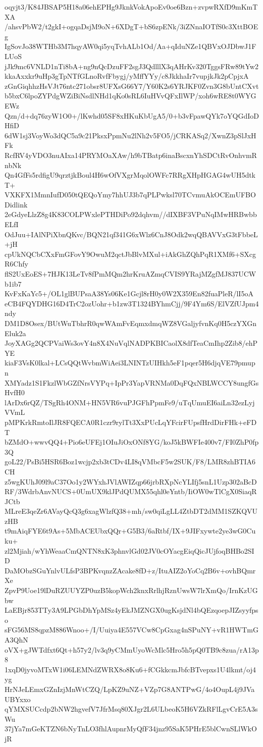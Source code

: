 oqyjt3/K84JBSAP5H18a06ehEPHg9JknkVokApoEv0oe6Bzn+zvpwRXfD9mKmTXA
/ahsvPbW2/t2gkI+ogqaDsjM9oN+6XDgT+bS6zpENk/3iZNnaIOTfS0c3XttBOEg
IgSovJo38WTHb3M7hqyAW0qi5yqTvhALb1Od/Aa+qIduNZe1QBVxOJDbwJ1FLUoS
jJk9mc6VNLD1nTi8bA+ng9nQcDzuFF2sgJ3QdlllX3qAHrKv320TggsFRw89tYw2
kkaAxxkr9uHp3gTpNTfGLnoRvfFbygj/yMffYYy/c8JkkhaIr7vupjkJk2pCpjxA
zGnGiqhhzHsVJt76ntc271obsr8UFXsG66Y7/Y60K2s6YRJKF0Zvn3G8bUntCXvt
b5bxC6lpoZYPdgWZiBiNsdlNHd1qKo0sRL6IuHVvQFxIlWP/xoh6wRE8t0WYGEWz
Qzn/d+dq76zyW1O0+/lKwhd05SF8xHKuKbUgA5/0+b3vFpawQYk7oYQGdIoDHfiD
6dW1sj3VoyWo3dQC5a9c21PksxPpmNu2lNh2v5FO5/jCRKASq2/XwnZ3pSlJxHFk
RcfRV4yVDO3nuAIxa14PRYMOaXAw/h9bTBatp6inaBscxnYhSDCtRvOnhvmRnbNk
Qn4GfFs5rdfigU9qrztjkBoul4H6wOfVXgrMqolOWFc7RRgXHpHGAG4wUH5dtkT+
VXKFX1MmnIufD050tQEQoYmy7hhUJ3b7qPLPwksl70TCvmuAkOCEmUFBODidlink
2eGdyeLlzZ8g4K83COLPWxlePTHDiPo92dqhvm//dIXBF3VPuNqIMwHRBwbbELfI
OdJuu+IAlNPiXbnQKvc/BQN21qf341G6xWlz6CnJ8Odk2wqQBAVVxG3tFbbeL+jH
cpUkNQCbCXxFmGFovY9OwuM2qctJbBlvMXul+iAkGhZQhPqR1XMf6+SXcgR6Chfy
flS2UxEoES+7HJK13LeTv8fPmMQm2hrKruAZmqCVIS9YRajMZgfMJ837UCWb1ib7
KvFxKaYc5+/OL1glBUPsaA38Ys06Ke1Gcjl8rH0y0W2X359En82fuaPleR/lI5oA
eCB4FQYDHG16D4TrC2ozUohr+b1zw3T1324BYhmCjj/9F4Ym6S/ElVZfUJpm4ndy
DM1D8Osex/BUtWuTbhrR0qwWAmFvEqmxdmqWZ8VGaljyfvnKq0H5czYXGnEluk2a
JoyXAGg2QCPVaiWs3ovY4n8X4NuVqlNADPKBICaolX8dfTeaCmIhp2Zib8/ehPYE
kiaF3VsK0lkal+LCsQQtWvbmWiAei3LNINTzUIHkh5eF1pqer5H6djqVE79pmupn
XMYadz1S1FkzlWbGZfNrsVYPq+IpPr3YapVRNMa0DqFQxNBLWCCY8ungfGsHvfH0
lArDx6rQZ/TSgRh4ONM+HN5VR6vuPJGFhPpmFe9/uTqUmuEI6aiLn32ezLyjVVmL
pMPKrkRmtoIlJR8FQECA0R1czr9rylTt3XxPUcLqYFcirFUpsfHrdDirFHk+eFDT
bZMdO+wwvQQ4+Pio6eUFEj1OIuJiOxONf8YG/koJ5kBWFIe400v7/FI0ZhP0fp3Q
goL22/PsBi5HSR6Boz1wcjp2xb3tCDv4LI8qVMbcF5w2SUK/F8/LMR8zhBTIA6CH
z5wgKUhJ09l9aC37Oo1y2WYxhJVlAWIZqp66jrbRXpNcYLIfj5snL1Uzp302aBcD
RF/3WdrbAnvNUCS+0UmUX9klJPdQUMX55qhl0eYntb/IiOW0wTlCgX0SiaqRJCtb
MLreE3qeZr6AVayQcQ3g6xagWlzfQ38+mh/sw0qiLgLL4ZtbDT2dMM1SZKQVUzHB
t9mAiqFYE6t9As+5MbACEUbxQQr+G5B3/6aRtbf/IX+9JIFxywte2ye3wG0Cuku+
zl2Mjiah/wYhWeaaCmQNTN8xK3phnvlGd02JV0cOYacgEiqQicJUjfoqBHBo2SID
DaMObzSGuYnlvULfsP3BPKvqnzZAcake8fD+z/ItuAIZ2oYoCq2B6v+ovhBQmrXe
ZpvP9Uoe19lDuRZUUYZP0uzB5kopWch2knxRrlhjRznUwsW7lrXmQo/IrnKzUGbw
LaEBjr853TTy3A9LPGbDhYpMSz4yEkJMZNGX0ugKsjdNl4bQEzqoepJIZsyyfpso
sFG56MS8qpzM886Wnoo+/I/Uuiya4E557VCw8CpGxag4nSPuNY+vR1HWTmGA3QhN
oVX+gJWTdfxt6Qt+h57y2/lv3q9yCMmUyoWcMlc5Hro5h5pQ0TB9c8zua/rA13p8
1xqD0jyvoMTxW1i06LEMNdZWRX8o8Ku6+fCGkkcmJbfcBTvepxs1U4lkmt/oj4yg
HrNJeLEmxGZnIzjMnWtCZQ/LpKZ9uNZ+VZp7G8ANTPwG/4o4OupL4j9JVaUBYxxo
qYMXSUCcdp2bNW2hgvefV7JfrMsq80XJgr2L6ULbeoK5H6VZkRFlLgvCrE5A3sWu
37jYa7mGeKTZN6bNyTnLO3fhlAupnrMyQfF34jnz95SaK5PHrE5blCwnSLlWkOjR
